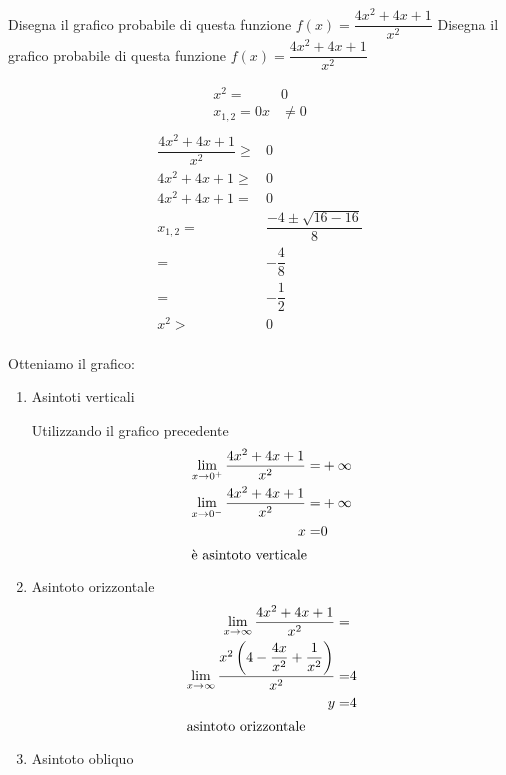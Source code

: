 \begin{exercise}
Disegna il grafico probabile di questa funzione $f(x)= \dfrac{4x^2+4x+1}{x^2}$
	\tcblower
Disegna il grafico probabile di questa funzione $f(x)= \dfrac{4x^2+4x+1}{x^2}$
	\begin{itemize}
	\begin{align*}
x^2=&0\\
x_{1,2}=0
x&\neq 0\\
	\end{align*}
	\begin{align*}
	 \dfrac{4x^2+4x+1}{x^2}\geq&0\\
	4x^2+4x+1\geq&0\\
	4x^2+4x+1=&0\\
	x_{1,2}=&\dfrac{-4\pm\sqrt{16-16}}{8}\\
	=&-\dfrac{4}{8}\\
	=&-\dfrac{1}{2}\\
	x^2>&0\\
	\end{align*}
	
	Otteniamo il grafico:
	\begin{center}
		
	\end{center}
	\begin{enumerate}
		\item Asintoti verticali
		
		Utilizzando il grafico precedente
		\begin{align*}
		\lim_{x\to 0^+}\dfrac{4x^2+4x+1}{x^2}=&+\infty\\
		\lim_{x\to 0^-}\dfrac{4x^2+4x+1}{x^2}=&+\infty\\
		x=&0\\
		\intertext{è asintoto verticale}
		\end{align*}
	\item Asintoto orizzontale 
		\begin{align*}
	\lim_{x\to \infty}\dfrac{4x^2+4x+1}{x^2}=&\\
	\lim_{x\to \infty}\dfrac{x^2\left(4-\dfrac{4x}{x^2}+\dfrac{1}{x^2}\right)}{x^2}=&4\\
	y=&4\\
	\intertext{asintoto orizzontale}
		\end{align*}
		\item Asintoto obliquo
		

\end{enumerate}
\end{itemize}
\end{exercise}
